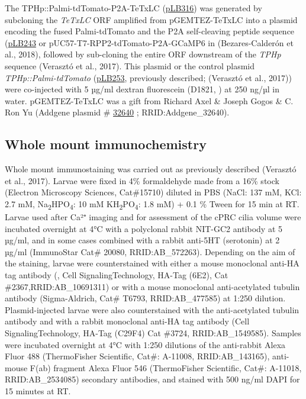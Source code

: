 \documentclass[
  11pt,
]{article}
\begin{document}
The TPHp::Palmi-tdTomato-P2A-TeTxLC
(\href{https://benchling.com/jekelylab/f/lib_sdvdcR5P-plasmidsstock_lbdb_jekelylab/seq_byQ18T5O-puc57-bamhi-tphp-asci-palmi-3xha-tdtomato-agei-p2a-noti-tetxlc-paci/edit}{pLB316})
was generated by subcloning the \emph{TeTxLC} ORF amplified from
pGEMTEZ-TeTxLC into a plasmid encoding the fused Palmi-tdTomato and the
P2A self-cleaving peptide sequence
(\href{https://benchling.com/jekelylab/f/lib_sdvdcR5P-plasmidsstock_lbdb_jekelylab/seq_mdeLSOGI-plb243/edit}{pLB243}
or pUC57-T7-RPP2-tdTomato-P2A-GCaMP6 in (Bezares-Calderón et al., 2018),
followed by sub-cloning the entire ORF downstream of the \emph{TPHp}
sequence (Verasztó et al., 2017). This plasmid or the control plasmid
\emph{TPHp::Palmi-tdTomato}
(\href{https://benchling.com/jekelylab/f/lib_sdvdcR5P-plasmidsstock_lbdb_jekelylab/seq_oLuEhx86-plb253/edit}{pLB253},
previously described; (Verasztó et al., 2017)) were co-injected with 5
µg/ml dextran fluorescein (D1821, ) at 250 ng/µl in water.
pGEMTEZ-TeTxLC was a gift from Richard Axel \& Joseph Gogos \& C. Ron Yu
(Addgene plasmid \# \href{http://n2t.net/addgene:32640}{32640} ;
RRID:Addgene\_32640).

\subsection{Whole mount
immunochemistry}\label{whole-mount-immunochemistry}

Whole mount immunostaining was carried out as previously described
(Verasztó et al., 2017). Larvae were fixed in 4\% formaldehyde made from
a 16\% stock (Electron Microscopy Sciences, Cat\#15710) diluted in PBS
(NaCl: 137 mM, KCl: 2.7 mM, Na\textsubscript{2}HPO\textsubscript{4}: 10
mM KH\textsubscript{2}PO\textsubscript{4}: 1.8 mM) + 0.1 \% Tween for 15
min at RT. Larvae used after Ca²⁺ imaging and for assessment of the cPRC
cilia volume were incubated overnight at 4°C with a polyclonal rabbit
NIT-GC2 antibody at 5 µg/ml, and in some cases combined with a rabbit
anti-5HT (serotonin) at 2 µg/ml (ImmunoStar Cat\# 20080,
RRID:AB\_572263). Depending on the aim of the staining, larvae were
counterstained with either a mouse monoclonal anti-HA tag antibody (,
Cell SignalingTechnology, HA-Tag (6E2), Cat \#2367,RRID:AB\_10691311) or
with a mouse monoclonal anti-acetylated tubulin antibody (Sigma-Aldrich,
Cat\# T6793, RRID:AB\_477585) at 1:250 dilution. Plasmid-injected larvae
were also counterstained with the anti-acetylated tubulin antibody and
with a rabbit monoclonal anti-HA tag antibody (Cell SignalingTechnology,
HA-Tag (C29F4) Cat \#3724, RRID:AB\_1549585). Samples were incubated
overnight at 4°C with 1:250 dilutions of the anti-rabbit Alexa Fluor 488
(ThermoFisher Scientific, Cat\#: A-11008, RRID:AB\_143165), anti-mouse
F(ab) fragment Alexa Fluor 546 (ThermoFisher Scientific, Cat\#: A-11018,
RRID:AB\_2534085) secondary antibodies, and stained with 500 ng/ml DAPI
for 15 minutes at RT.
\end{document}
